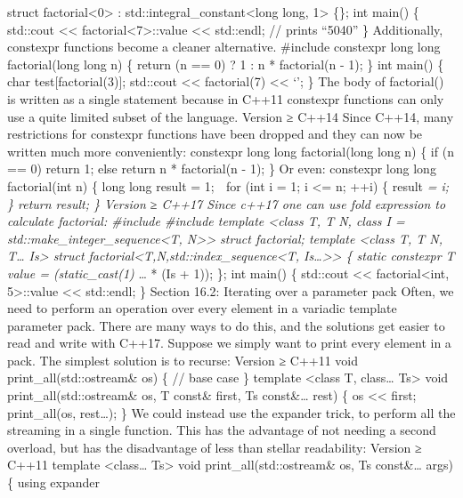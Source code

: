 struct factorial\textless0\textgreater{} :
std::integral\_constant\textless long long, 1\textgreater{} \{\}; int
main() \{ std::cout \textless\textless{}
factorial\textless7\textgreater::value \textless\textless{} std::endl;
// prints ``5040'' \} Additionally, constexpr functions become a cleaner
alternative. \#include constexpr long long factorial(long long n) \{
return (n == 0) ? 1 : n * factorial(n - 1); \} int main() \{ char
test{[}factorial(3){]}; std::cout \textless\textless{} factorial(7)
\textless\textless{} `\n'; \} The body of factorial() is written as a
single statement because in C++11 constexpr functions can only use a
quite limited subset of the language. Version ≥ C++14 Since C++14, many
restrictions for constexpr functions have been dropped and they can now
be written much more conveniently: constexpr long long factorial(long
long n) \{ if (n == 0) return 1; else return n * factorial(n - 1); \} Or
even: constexpr long long factorial(int n) \{ long long result = 1; 
for (int i = 1; i \textless= n; ++i) \{ result \emph{= i; \} return
result; \} Version ≥ C++17 Since c++17 one can use fold expression to
calculate factorial: \#include \#include template \textless class T, T
N, class I = std::make\_integer\_sequence\textless T,
N\textgreater\textgreater{} struct factorial; template \textless class
T, T N, T\ldots{} Is\textgreater{} struct
factorial\textless T,N,std::index\_sequence\textless T,
Is\ldots\textgreater\textgreater{} \{ static constexpr T value =
(static\_cast(1) } \ldots{} * (Is + 1)); \}; int main() \{ std::cout
\textless\textless{} factorial\textless int, 5\textgreater::value
\textless\textless{} std::endl; \} Section 16.2: Iterating over a
parameter pack Often, we need to perform an operation over every element
in a variadic template parameter pack. There are many ways to do this,
and the solutions get easier to read and write with C++17. Suppose we
simply want to print every element in a pack. The simplest solution is
to recurse: Version ≥ C++11 void print\_all(std::ostream\& os) \{ //
base case \} template \textless class T, class\ldots{} Ts\textgreater{}
void print\_all(std::ostream\& os, T const\& first, Ts const\&\ldots{}
rest) \{ os \textless\textless{} first; print\_all(os, rest\ldots); \}
We could instead use the expander trick, to perform all the streaming in
a single function. This has the advantage of not needing a second
overload, but has the disadvantage of less than stellar readability:
Version ≥ C++11 template \textless class\ldots{} Ts\textgreater{} void
print\_all(std::ostream\& os, Ts const\&\ldots{} args) \{ using expander
